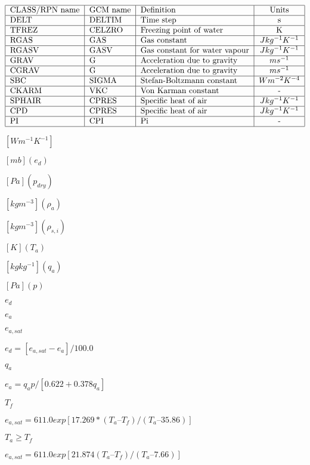 \documentclass{article}
\begin{document}
\[ \begin{tabular} { | l | l | l | c | } \hline CLASS/RPN name & GCM name & Definition & Units \\ \hline DELT & DELTIM & Time step & s \\ \hline TFREZ & CELZRO & Freezing point of water & K \\ \hline RGAS & GAS & Gas constant & $J kg^{-1} K^{-1}$ \\ \hline RGASV & GASV & Gas constant for water vapour & $J kg^{-1} K^{-1}$ \\ \hline GRAV & G & Acceleration due to gravity & $m s^{-1} $ \\ \hline CGRAV & G & Acceleration due to gravity & $m s^{-1} $ \\ \hline SBC & SIGMA & Stefan-Boltzmann constant & $W m^{-2} K^{-4} $ \\ \hline CKARM & VKC & Von Karman constant & - \\ \hline SPHAIR & CPRES & Specific heat of air & $J kg^{-1} K^{-1}$ \\ \hline CPD & CPRES & Specific heat of air & $J kg^{-1} K^{-1}$ \\ \hline PI & CPI & Pi & - \\ \hline \end{tabular} \]
\pagebreak

$[W m^{-1} K^{-1}]$
\pagebreak

$[mb] (e_d)$
\pagebreak

$[Pa] (p_{dry})$
\pagebreak

$[kg m^{-3}] (\rho_a)$
\pagebreak

$[kg m^{-3}] (\rho_{s,i})$
\pagebreak

$[K] (T_a)$
\pagebreak

$[kg kg^{-1}] (q_a)$
\pagebreak

$[Pa] (p)$
\pagebreak

$e_d$
\pagebreak

$e_a$
\pagebreak

$e_{a,sat}$
\pagebreak

$e_d = [e_{a,sat} - e_a] /100.0$
\pagebreak

$q_a$
\pagebreak

$e_a = q_a p /[0.622 + 0.378 q_a ]$
\pagebreak

$T_f$
\pagebreak

$e_{a,sat} = 611.0 exp[17.269*(T_a – T_f)/(T_a – 35.86)]$
\pagebreak

$T_a \geq T_f$
\pagebreak

$e_{a,sat} = 611.0 exp[21.874 (T_a – T_f)/(T_a – 7.66)]$
\pagebreak
\end{document}
